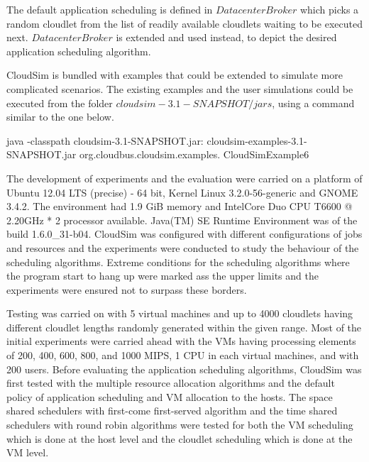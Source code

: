 \documentclass[times, 10pt,twocolumn]{article}
\begin{document}
The default application scheduling is defined in $DatacenterBroker$ which picks a random cloudlet from the list of readily available cloudlets waiting to be executed next. $DatacenterBroker$ is extended and used instead, to depict the desired application scheduling algorithm.

CloudSim is bundled with examples that could be extended to simulate more complicated scenarios. The existing examples and the user simulations could be executed from the folder $cloudsim-3.1-SNAPSHOT/jars$, using a command similar to the one below.
\begin{verbatimtab}
java -classpath
    cloudsim-3.1-SNAPSHOT.jar:
    cloudsim-examples-3.1-SNAPSHOT.jar 
    org.cloudbus.cloudsim.examples.
    CloudSimExample6
\end{verbatimtab}

The development of experiments and the evaluation were carried on a platform of Ubuntu 12.04 LTS (precise) - 64 bit, Kernel Linux 3.2.0-56-generic and GNOME 3.4.2. The environment had 1.9 GiB memory and Intel\textregistered Core Duo CPU T6600 @ 2.20GHz * 2 processor available. Java(TM) SE Runtime Environment was of the build 1.6.0\_31-b04.
CloudSim was configured with different configurations of jobs and resources and the experiments were conducted to study the behaviour of the scheduling algorithms. Extreme conditions for the scheduling algorithms where the program start to hang up were marked ass the upper limits and the experiments were ensured not to surpass these borders. 

Testing was carried on with 5 virtual machines and up to 4000 cloudlets having different cloudlet lengths randomly generated within the given range. Most of the initial experiments were carried ahead with the VMs having processing elements of 200, 400, 600, 800, and 1000 MIPS, 1 CPU in each virtual machines, and with 200 users.
Before evaluating the application scheduling algorithms, CloudSim was first tested with the multiple resource allocation algorithms and the default policy of application scheduling and VM allocation to the hosts. The space shared schedulers with first-come first-served algorithm and the time shared schedulers with round robin algorithms were tested for both the VM scheduling which is done at the host level and the cloudlet scheduling which is done at the VM level. 
\end{document}
